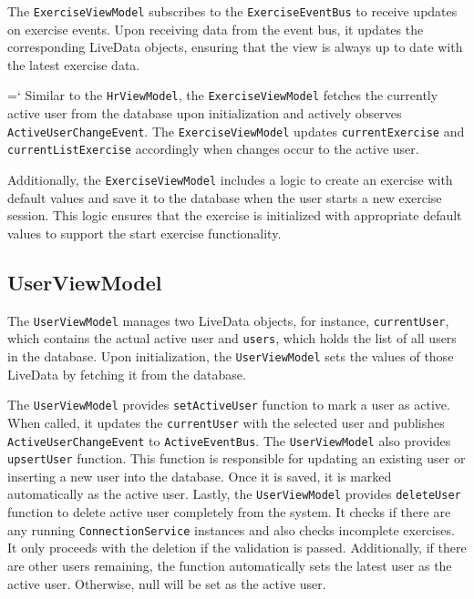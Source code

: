 The \verb;ExerciseViewModel; subscribes to the \verb;ExerciseEventBus; to receive updates on exercise events. Upon receiving data from the event bus, it updates the corresponding LiveData objects, ensuring that the view is always up to date with the latest exercise data.

{{\ttfamily \hyphenchar\the\font=`\-}
Similar to the \verb;HrViewModel;, the \verb;ExerciseViewModel; fetches the currently active user from the database upon initialization and actively observes \texttt{ActiveUserChangeEvent}.
The \verb;ExerciseViewModel; updates \verb;currentExercise; and \texttt{currentListExercise} accordingly when changes occur to the active user.
\par}

Additionally, the \verb;ExerciseViewModel; includes a logic to create an exercise with default values and save it to the database when the user starts a new exercise session. This logic ensures that the exercise is initialized with appropriate default values to support the start exercise functionality.

\subsection{UserViewModel}
\label{chap:userviewmodel_impl}
The \texttt{UserViewModel} manages two LiveData objects, for instance, \texttt{currentUser}, which contains the actual active user and \texttt{users}, which holds the list of all users in the database. 
Upon initialization, the \texttt{UserViewModel} sets the values of those LiveData by fetching it from the database.

The \texttt{UserViewModel} provides \texttt{setActiveUser} function to mark a user as active. When called, it updates the \texttt{currentUser} with the selected user and publishes \texttt{ActiveUserChangeEvent} to \texttt{ActiveEventBus}.
The \texttt{UserViewModel} also provides \texttt{upsertUser} function. This function is responsible for updating an existing user or inserting a new user into the database. Once it is saved, it is marked automatically as the active user.
Lastly, the \texttt{UserViewModel} provides \texttt{deleteUser} function to delete active user completely from the system.
It checks if there are any running \texttt{ConnectionService} instances and also checks incomplete exercises. 
It only proceeds with the deletion if the validation is passed. Additionally, if there are other users remaining, the function automatically sets the latest user as the active user. Otherwise, null will be set as the active user.

